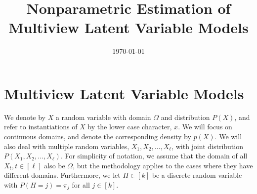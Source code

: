 \documentclass[11pt]{article}
\title{Nonparametric Estimation of Multiview Latent Variable Models}
\date{\today}
\begin{document}
\maketitle

\begin{abstract}


\end{abstract}

\section{Multiview Latent Variable Models}

We denote by $X$ a random variable with domain $\Omega$ and distribution $P(X)$, and refer to instantiations of $X$ by the lower case character, $x$.
We will focus on continuous domains, and denote the corresponding density by $p(X)$. We will also deal with multiple random variables, $X_1, X_2, \ldots, X_{\ell}$, with joint distribution $P(X_1,X_2,\ldots,X_{\ell})$. For simplicity of notation, we assume that the domain of all $X_t, t \in [\ell]$ also be $\Omega$, but the methodology applies to the cases where they have different domains. Furthermore, we let $H \in [k]$ be a discrete random variable with $P(H =
j) = \pi_j$ for all $j \in [k]$.
\end{document}
